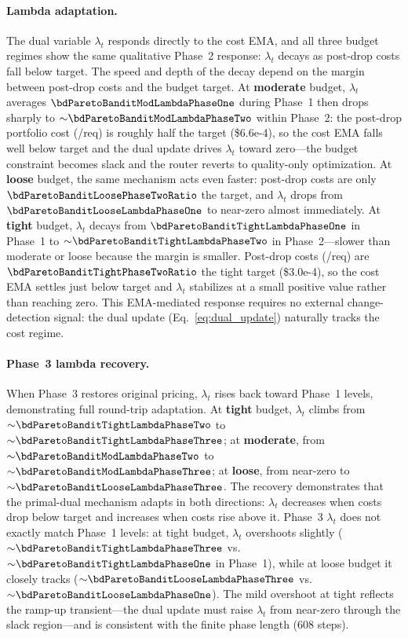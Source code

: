 \paragraph{Lambda adaptation.}
The dual variable $\lambda_t$ responds directly to the cost EMA,
and all three budget regimes show the same qualitative Phase~2
response: $\lambda_t$ decays as post-drop costs fall below target.
The speed and depth of the decay depend on the margin between
post-drop costs and the budget target.
At \textbf{moderate} budget, $\lambda_t$ averages
$\bdParetoBanditModLambdaPhaseOne$ during Phase~1 then drops sharply
to ${\sim}\bdParetoBanditModLambdaPhaseTwo$ within Phase~2:
the post-drop portfolio cost (\bdParetoBanditModPhaseTwoCost/req)
is roughly half the target (\$6.6e-4), so the cost EMA falls well
below target and the dual update drives $\lambda_t$ toward
zero---the budget constraint becomes slack and the router reverts
to quality-only optimization.
At \textbf{loose} budget, the same mechanism acts even faster:
post-drop costs are only $\bdParetoBanditLoosePhaseTwoRatio$ the
target, and $\lambda_t$ drops from
$\bdParetoBanditLooseLambdaPhaseOne$ to near-zero almost
immediately.
At \textbf{tight} budget, $\lambda_t$ decays from
$\bdParetoBanditTightLambdaPhaseOne$ in Phase~1 to
${\sim}\bdParetoBanditTightLambdaPhaseTwo$ in Phase~2---slower
than moderate or loose because the margin is smaller.  Post-drop
costs (\bdParetoBanditTightPhaseTwoCost/req) are
$\bdParetoBanditTightPhaseTwoRatio$ the tight target (\$3.0e-4),
so the cost EMA settles just below target and $\lambda_t$
stabilizes at a small positive value rather than reaching zero.
This EMA-mediated response requires no external change-detection
signal: the dual update (Eq.~\ref{eq:dual_update}) naturally tracks
the cost regime.

\paragraph{Phase~3 lambda recovery.}
When Phase~3 restores original pricing, $\lambda_t$ rises back
toward Phase~1 levels, demonstrating full round-trip adaptation.
At \textbf{tight} budget, $\lambda_t$ climbs from
${\sim}\bdParetoBanditTightLambdaPhaseTwo$ to
${\sim}\bdParetoBanditTightLambdaPhaseThree$;
at \textbf{moderate}, from
${\sim}\bdParetoBanditModLambdaPhaseTwo$ to
${\sim}\bdParetoBanditModLambdaPhaseThree$;
at \textbf{loose}, from near-zero to
${\sim}\bdParetoBanditLooseLambdaPhaseThree$.
The recovery demonstrates that the primal-dual mechanism adapts
in both directions: $\lambda_t$ decreases when costs drop below
target and increases when costs rise above it.
Phase~3 $\lambda_t$ does not exactly match Phase~1 levels: at tight
budget, $\lambda_t$ overshoots slightly
(${\sim}\bdParetoBanditTightLambdaPhaseThree$ vs.\
${\sim}\bdParetoBanditTightLambdaPhaseOne$ in Phase~1),
while at loose budget it closely tracks
(${\sim}\bdParetoBanditLooseLambdaPhaseThree$ vs.\
${\sim}\bdParetoBanditLooseLambdaPhaseOne$).
The mild overshoot at tight reflects the ramp-up transient---the dual
update must raise $\lambda_t$ from near-zero through the slack
region---and is consistent with the finite phase length (608 steps).

